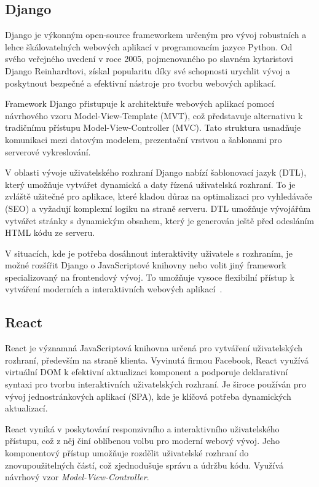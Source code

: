 \subsection{Django}
\label{subsec:dev-framework-django}
Django je výkonným open-source frameworkem určeným pro vývoj robustních a lehce škálovatelných webových aplikací v programovacím jazyce Python. Od svého veřejného uvedení v roce 2005, pojmenovaného po slavném kytaristovi Django Reinhardtovi, získal popularitu díky své schopnosti urychlit vývoj a poskytnout bezpečné a efektivní nástroje pro tvorbu webových aplikací.

Framework Django přistupuje k architektuře webových aplikací pomocí návrhového vzoru Model-View-Template (MVT), což představuje alternativu k tradičnímu přístupu Model-View-Controller (MVC). Tato struktura usnadňuje komunikaci mezi datovým modelem, prezentační vrstvou a šablonami pro serverové vykreslování.

V oblasti vývoje uživatelského rozhraní Django nabízí šablonovací jazyk (DTL), který umožňuje vytvářet dynamická a daty řízená uživatelská rozhraní. To je zvláště užitečné pro aplikace, které kladou důraz na optimalizaci pro vyhledávače (SEO) a vyžadují komplexní logiku na straně serveru. DTL umožňuje vývojářům vytvářet stránky s dynamickým obsahem, který je generován ještě před odesláním HTML kódu ze serveru.

V situacích, kde je potřeba dosáhnout interaktivity uživatele s rozhraním, je možné rozšířit Django o JavaScriptové knihovny nebo volit jiný framework specializovaný na frontendový vývoj. To umožňuje vysoce flexibilní přístup k vytváření moderních a interaktivních webových aplikací~\cite{about_django}.

\subsection{React}
\label{subsec:dev-framework-react}
React je významná JavaScriptová knihovna určená pro vytváření uživatelských rozhraní, především na straně klienta. Vyvinutá firmou Facebook, React využívá virtuální DOM k efektivní aktualizaci komponent a podporuje deklarativní syntaxi pro tvorbu interaktivních uživatelských rozhraní. Je široce používán pro vývoj jednostránkových aplikací (SPA), kde je klíčová potřeba dynamických aktualizací.

React vyniká v poskytování responzivního a interaktivního uživatelského přístupu, což z něj činí oblíbenou volbu pro moderní webový vývoj. Jeho komponentový přístup umožňuje rozdělit uživatelské rozhraní do znovupoužitelných částí, což zjednodušuje správu a údržbu kódu. Využívá návrhový vzor \textit{Model-View-Controller}. \cite{about_react}

